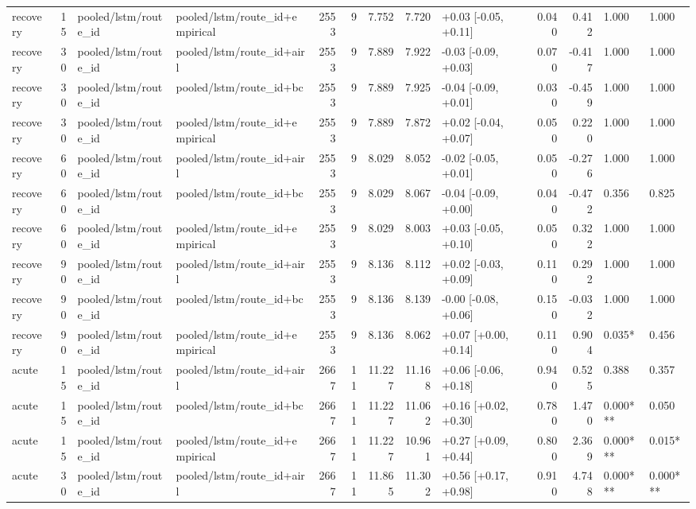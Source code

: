 \begin{tabular}{lrllrrrrlrrll}
recovery & 15 & pooled/lstm/route_id & pooled/lstm/route_id+empirical & 2553 & 9 & 7.752 & 7.720 & +0.03 [-0.05, +0.11] & 0.040 & 0.412 & 1.000 & 1.000 \\
recovery & 30 & pooled/lstm/route_id & pooled/lstm/route_id+airl & 2553 & 9 & 7.889 & 7.922 & -0.03 [-0.09, +0.03] & 0.070 & -0.417 & 1.000 & 1.000 \\
recovery & 30 & pooled/lstm/route_id & pooled/lstm/route_id+bc & 2553 & 9 & 7.889 & 7.925 & -0.04 [-0.09, +0.01] & 0.030 & -0.459 & 1.000 & 1.000 \\
recovery & 30 & pooled/lstm/route_id & pooled/lstm/route_id+empirical & 2553 & 9 & 7.889 & 7.872 & +0.02 [-0.04, +0.07] & 0.050 & 0.220 & 1.000 & 1.000 \\
recovery & 60 & pooled/lstm/route_id & pooled/lstm/route_id+airl & 2553 & 9 & 8.029 & 8.052 & -0.02 [-0.05, +0.01] & 0.050 & -0.276 & 1.000 & 1.000 \\
recovery & 60 & pooled/lstm/route_id & pooled/lstm/route_id+bc & 2553 & 9 & 8.029 & 8.067 & -0.04 [-0.09, +0.00] & 0.040 & -0.472 & 0.356 & 0.825 \\
recovery & 60 & pooled/lstm/route_id & pooled/lstm/route_id+empirical & 2553 & 9 & 8.029 & 8.003 & +0.03 [-0.05, +0.10] & 0.050 & 0.322 & 1.000 & 1.000 \\
recovery & 90 & pooled/lstm/route_id & pooled/lstm/route_id+airl & 2553 & 9 & 8.136 & 8.112 & +0.02 [-0.03, +0.09] & 0.110 & 0.292 & 1.000 & 1.000 \\
recovery & 90 & pooled/lstm/route_id & pooled/lstm/route_id+bc & 2553 & 9 & 8.136 & 8.139 & -0.00 [-0.08, +0.06] & 0.150 & -0.032 & 1.000 & 1.000 \\
recovery & 90 & pooled/lstm/route_id & pooled/lstm/route_id+empirical & 2553 & 9 & 8.136 & 8.062 & +0.07 [+0.00, +0.14] & 0.110 & 0.904 & 0.035* & 0.456 \\
acute & 15 & pooled/lstm/route_id & pooled/lstm/route_id+airl & 2667 & 11 & 11.227 & 11.168 & +0.06 [-0.06, +0.18] & 0.940 & 0.525 & 0.388 & 0.357 \\
acute & 15 & pooled/lstm/route_id & pooled/lstm/route_id+bc & 2667 & 11 & 11.227 & 11.062 & +0.16 [+0.02, +0.30] & 0.780 & 1.470 & 0.000*** & 0.050 \\
acute & 15 & pooled/lstm/route_id & pooled/lstm/route_id+empirical & 2667 & 11 & 11.227 & 10.961 & +0.27 [+0.09, +0.44] & 0.800 & 2.369 & 0.000*** & 0.015* \\
acute & 30 & pooled/lstm/route_id & pooled/lstm/route_id+airl & 2667 & 11 & 11.865 & 11.302 & +0.56 [+0.17, +0.98] & 0.910 & 4.748 & 0.000*** & 0.000*** \\

\end{tabular}
